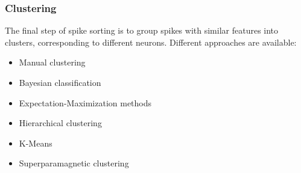 \subsubsection{Clustering}
The final step of spike sorting is to group spikes with similar features into
clusters, corresponding to different neurons. Different approaches are available:
\begin{itemize}
    \item Manual clustering
    \item Bayesian classification
    \item Expectation-Maximization methods
    \item Hierarchical clustering
    \item K-Means
    \item Superparamagnetic clustering
\end{itemize}
